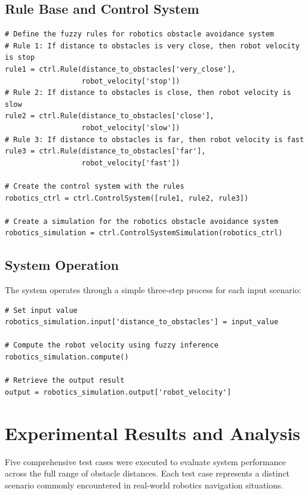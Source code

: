 \documentclass[11pt,a4paper]{article}
\begin{document}
\subsection{Rule Base and Control System}

\begin{lstlisting}[caption=Fuzzy Rules and Control System Creation]
# Define the fuzzy rules for robotics obstacle avoidance system
# Rule 1: If distance to obstacles is very close, then robot velocity is stop
rule1 = ctrl.Rule(distance_to_obstacles['very_close'], 
                  robot_velocity['stop'])
# Rule 2: If distance to obstacles is close, then robot velocity is slow
rule2 = ctrl.Rule(distance_to_obstacles['close'], 
                  robot_velocity['slow'])
# Rule 3: If distance to obstacles is far, then robot velocity is fast
rule3 = ctrl.Rule(distance_to_obstacles['far'], 
                  robot_velocity['fast'])

# Create the control system with the rules
robotics_ctrl = ctrl.ControlSystem([rule1, rule2, rule3])

# Create a simulation for the robotics obstacle avoidance system
robotics_simulation = ctrl.ControlSystemSimulation(robotics_ctrl)
\end{lstlisting}

\subsection{System Operation}

The system operates through a simple three-step process for each input scenario:

\begin{lstlisting}[caption=System Operation Example]
# Set input value
robotics_simulation.input['distance_to_obstacles'] = input_value

# Compute the robot velocity using fuzzy inference
robotics_simulation.compute()

# Retrieve the output result
output = robotics_simulation.output['robot_velocity']
\end{lstlisting}

\section{Experimental Results and Analysis}

Five comprehensive test cases were executed to evaluate system performance across the full range of obstacle distances. Each test case represents a distinct scenario commonly encountered in real-world robotics navigation situations.
\end{document}
